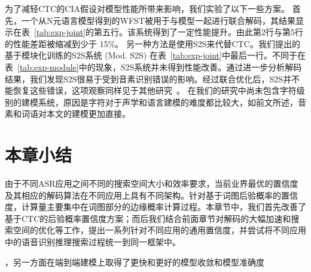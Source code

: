 为了减轻CTC的CIA假设对模型性能所带来影响，我们实验了以下一些方案。
首先，一个从N元语言模型得到的WFST被用于与模型一起进行联合解码，其结果显示在表~\ref{tab:exp-joint}的第五行。该系统得到了一定性能提升。由此第2行与第5行的性能差距被缩减到少于 15\%。
%
另一种方法是使用S2S来代替CTC。我们提出的基于模块化训练的S2S系统 (Mod. S2S) 在表~\ref{tab:exp-joint}中最后一行。不同于在表~\ref{tab:exp-module}中的现象，S2S系统并未得到性能改善。通过进一步分析解码结果，我们发现S2S很易于受到音素识别错误的影响。经过联合优化后，S2S并不能恢复这些错误，这项观察同样见于其他研究~\cite{prabhavalkar2017comparison}。
在我们的研究中尚未包含字符级别的建模系统，原因是字符对于声学和语言建模的难度都比较大，如前文所述，音素和词语对本文的建模更加直接。


    
\section{本章小结}
\label{chap:unify-sum}
由于不同ASR应用之间不同的搜索空间大小和效率要求，当前业界最优的置信度及其相应的解码算法在不同应用上具有不同架构。针对基于词图后验概率的置信度，计算量主要集中在词图部分的边缘概率计算过程。本章节中，我们首先改善了基于CTC的后验概率置信度方案；而后我们结合前面章节对解码的大幅加速和搜索空间的优化等工作，提出一系列针对不同应用的通用置信度，并尝试将不同应用中的语音识别推理搜索过程统一到同一框架中。

，另一方面在端到端建模上取得了更快和更好的模型收敛和模型准确度